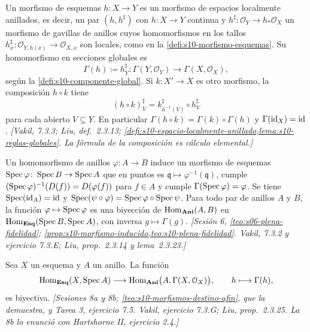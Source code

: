 \begin{defi}
\label{defi:s11-morfismo-esquemas}
Un morfismo de esquemas \(h\colon X\to Y\) es un morfismo de espacios localmente anillados, es decir, un par \((h,h^\sharp)\) con \(h\colon X\to Y\) continua y \(h^\sharp\colon\mathcal O_Y\to h_*\mathcal O_X\) un morfismo de gavillas de anillos cuyos homomorfismos en los tallos \(h^\sharp_x\colon\mathcal O_{Y,h(x)}\to\mathcal O_{X,x}\) son locales, como en la \cref{defi:s10-morfismo-esquemas}. Su homomorfismo en secciones globales es
\[
 \Gamma(h)\coloneqq h_Y^\sharp\colon\Gamma(Y,\mathcal O_Y)\longrightarrow\Gamma(X,\mathcal O_X),
\]
según la \cref{defi:s10-componente-global}. Si \(k\colon X'\to X\) es otro morfismo, la composición \(h\circ k\) tiene
\[
 (h\circ k)^\sharp_V=k^\sharp_{h^{-1}(V)}\circ h^\sharp_V
\]
para cada abierto \(V\subseteq Y\). En particular \(\Gamma(h\circ k)=\Gamma(k)\circ\Gamma(h)\) y \(\Gamma(\operatorname{id}_X)=\operatorname{id}\). \emph{[Vakil, 7.3.3; Liu, def.~2.3.13; \cref{defi:s10-espacio-localmente-anillado,lema:s10-reglas-globales}. La fórmula de la composición es cálculo elemental.]}
\end{defi}

\begin{prop}
\label{prop:s11-espectro-plena-fidelidad}
Un homomorfismo de anillos \(\varphi\colon A\to B\) induce un morfismo de esquemas \(\operatorname{Spec}\varphi\colon\operatorname{Spec} B\to\operatorname{Spec} A\) que en puntos es \(\mathfrak q\mapsto\varphi^{-1}(\mathfrak q)\), cumple \((\operatorname{Spec}\varphi)^{-1}(D(f))=D(\varphi(f))\) para \(f\in A\) y cumple \(\Gamma(\operatorname{Spec}\varphi)=\varphi\). Se tiene \(\operatorname{Spec}(\operatorname{id}_A)=\operatorname{id}\) y \(\operatorname{Spec}(\psi\circ\varphi)=\operatorname{Spec}\varphi\circ\operatorname{Spec}\psi\). Para todo par de anillos \(A\) y \(B\), la función \(\varphi\mapsto\operatorname{Spec}\varphi\) es una biyección de \(\operatorname{Hom}_{\mathbf{Ani}}(A,B)\) en \(\operatorname{Hom}_{\mathbf{Esq}}(\operatorname{Spec} B,\operatorname{Spec} A)\), con inversa \(g\mapsto\Gamma(g)\). \emph{[Sesión 6, \cref{teo:s06-plena-fidelidad}; \cref{prop:s10-morfismo-inducido,teo:s10-plena-fidelidad}. Vakil, 7.3.2 y ejercicio 7.3.E; Liu, prop.~2.3.14 y lema~2.3.23.]}
\end{prop}

\begin{teo}[El teorema de la 8b]
\label{teo:s11-teorema-ocho}
Sea \(X\) un esquema y \(A\) un anillo. La función
\[
 \operatorname{Hom}_{\mathbf{Esq}}(X,\operatorname{Spec} A)\longrightarrow\operatorname{Hom}_{\mathbf{Ani}}\bigl(A,\Gamma(X,\mathcal O_X)\bigr),
 \qquad h\longmapsto\Gamma(h),
\]
es biyectiva. \emph{[Sesiones 8a y 8b; \cref{teo:s10-morfismos-destino-afin}, que la demuestra, y Tarea 3, ejercicio 7.5. Vakil, ejercicio 7.3.G; Liu, prop.~2.3.25. La 8b lo enunció con Hartshorne II, ejercicio 2.4.]}
\end{teo}

